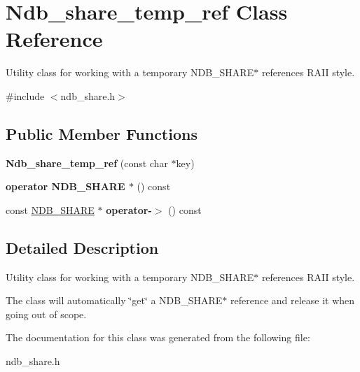 \hypertarget{classNdb__share__temp__ref}{}\section{Ndb\+\_\+share\+\_\+temp\+\_\+ref Class Reference}
\label{classNdb__share__temp__ref}


Utility class for working with a temporary N\+D\+B\+\_\+\+S\+H\+A\+R\+E$\ast$ references R\+A\+II style.  




{\ttfamily \#include $<$ndb\+\_\+share.\+h$>$}

\subsection*{Public Member Functions}
\begin{DoxyCompactItemize}
\item 
\mbox{\label{classNdb__share__temp__ref_a6ae9ebca4b69fa4922f7b70f87874a7b}} 
{\bfseries Ndb\+\_\+share\+\_\+temp\+\_\+ref} (const char $\ast$key)
\item 
\mbox{\label{classNdb__share__temp__ref_a6f7caad3d1126955ca7a0f2242bd6eb9}} 
{\bfseries operator N\+D\+B\+\_\+\+S\+H\+A\+R\+E $\ast$} () const
\item 
\mbox{\label{classNdb__share__temp__ref_a7597e886e2849e500ab076059b7e9dc7}} 
const \mbox{\hyperlink{structNDB__SHARE}{N\+D\+B\+\_\+\+S\+H\+A\+RE}} $\ast$ {\bfseries operator-\/$>$} () const
\end{DoxyCompactItemize}


\subsection{Detailed Description}
Utility class for working with a temporary N\+D\+B\+\_\+\+S\+H\+A\+R\+E$\ast$ references R\+A\+II style. 

The class will automatically \char`\"{}get\char`\"{} a N\+D\+B\+\_\+\+S\+H\+A\+R\+E$\ast$ reference and release it when going out of scope. 

The documentation for this class was generated from the following file\+:\begin{DoxyCompactItemize}
\item 
ndb\+\_\+share.\+h\end{DoxyCompactItemize}
